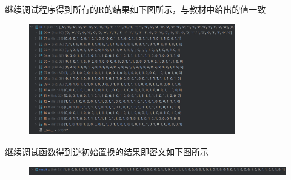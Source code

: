 \documentclass[a4paper,11pt,UTF8]{ctexart}
\newcommand{\bottomcaption}{%
\setlength{\abovecaptionskip}{6pt}%
\setlength{\belowcaptionskip}{6pt}%
\caption}
\newcommand{\xiaowuhao}{\fontsize{9pt}{\baselineskip}\selectfont}   %
\begin{document}
            继续调试程序得到所有的R的结果如下图所示，与教材中给出的值一致
            \begin{figure}[H]
                \centering
                \includegraphics[width=9cm]{R.png}
                \bottomcaption{\xiaowuhao{R的值}}
            \end{figure}
            继续调试函数得到逆初始置换的结果即密文如下图所示
            \begin{figure}[H]
                \centering
                \includegraphics[width=15cm]{密文.png}
                \bottomcaption{\xiaowuhao{64位密文}}
            \end{figure}
\end{document}
